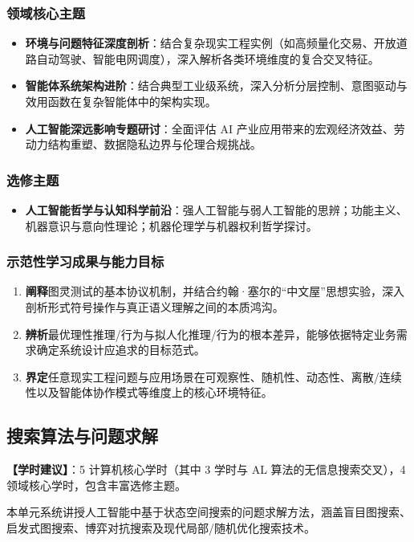 \subsubsection{领域核心主题}
\begin{itemize}
    \item \textbf{环境与问题特征深度剖析}：结合复杂现实工程实例（如高频量化交易、开放道路自动驾驶、智能电网调度），深入解析各类环境维度的复合交叉特征。
    \item \textbf{智能体系统架构进阶}：结合典型工业级系统，深入分析分层控制、意图驱动与效用函数在复杂智能体中的架构实现。
    \item \textbf{人工智能深远影响专题研讨}：全面评估 AI 产业应用带来的宏观经济效益、劳动力结构重塑、数据隐私边界与伦理合规挑战。
\end{itemize}

\subsubsection{选修主题}
\begin{itemize}
    \item \textbf{人工智能哲学与认知科学前沿}：强人工智能与弱人工智能的思辨；功能主义、机器意识与意向性理论；机器伦理学与机器权利哲学探讨。
\end{itemize}

\subsubsection{示范性学习成果与能力目标}
\begin{enumerate}
    \item \textbf{阐释}图灵测试的基本协议机制，并结合约翰·塞尔的“中文屋”思想实验，深入剖析形式符号操作与真正语义理解之间的本质鸿沟。
    \item \textbf{辨析}最优理性推理/行为与拟人化推理/行为的根本差异，能够依据特定业务需求确定系统设计应追求的目标范式。
    \item \textbf{界定}任意现实工程问题与应用场景在可观察性、随机性、动态性、离散/连续性以及智能体协作模式等维度上的核心环境特征。
\end{enumerate}

\subsection{搜索算法与问题求解}
\textbf{【学时建议】}：5 计算机核心学时（其中 3 学时与 AL 算法的无信息搜索交叉），4 领域核心学时，包含丰富选修主题。

本单元系统讲授人工智能中基于状态空间搜索的问题求解方法，涵盖盲目图搜索、启发式图搜索、博弈对抗搜索及现代局部/随机优化搜索技术。

